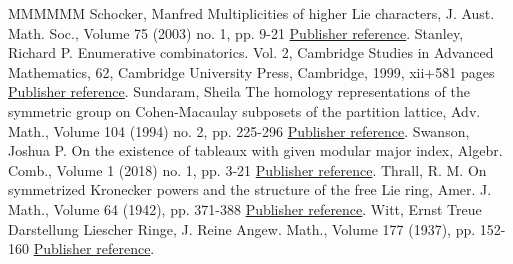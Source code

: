 \begin{thebibliography}{MMMMMM}
 Schocker, Manfred Multiplicities of higher Lie characters, J. Aust. Math. Soc., Volume 75 (2003) no. 1, pp. 9-21 \href{https://alco.centre-mersenne.org/articles/10.5802/alco.421/#Sch}{Publisher reference}.
 Stanley, Richard P. Enumerative combinatorics. Vol. 2, Cambridge Studies in Advanced Mathematics, 62, Cambridge University Press, Cambridge, 1999, xii+581 pages \href{https://alco.centre-mersenne.org/articles/10.5802/alco.421/#Stan}{Publisher reference}.
 Sundaram, Sheila The homology representations of the symmetric group on Cohen-Macaulay subposets of the partition lattice, Adv. Math., Volume 104 (1994) no. 2, pp. 225-296 \href{https://alco.centre-mersenne.org/articles/10.5802/alco.421/#Sun}{Publisher reference}.
 Swanson, Joshua P. On the existence of tableaux with given modular major index, Algebr. Comb., Volume 1 (2018) no. 1, pp. 3-21 \href{https://alco.centre-mersenne.org/articles/10.5802/alco.421/#Swa}{Publisher reference}.
 Thrall, R. M. On symmetrized Kronecker powers and the structure of the free Lie ring, Amer. J. Math., Volume 64 (1942), pp. 371-388 \href{https://alco.centre-mersenne.org/articles/10.5802/alco.421/#Thrall}{Publisher reference}.
 Witt, Ernst Treue Darstellung Liescher Ringe, J. Reine Angew. Math., Volume 177 (1937), pp. 152-160 \href{https://alco.centre-mersenne.org/articles/10.5802/alco.421/#Witt}{Publisher reference}.
\end{thebibliography}

